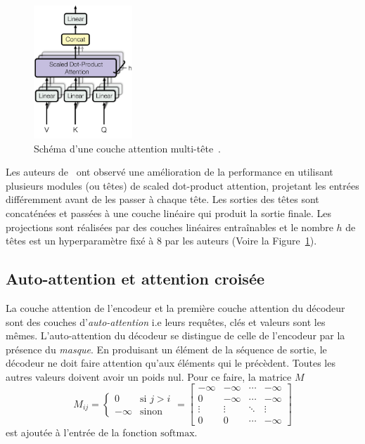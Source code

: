\begin{figure}[hbt]
    \centering
    \includegraphics[height=5cm]{assets/images/multihead-attention.png}
    \caption[Schéma d'une couche attention multitête.]
    {Schéma d'une couche attention multi-tête~\cite[Fig 2]{attention}.}
    \label{fig.multihead-attention}
\end{figure}

Les auteurs de~\cite{attention} ont observé une amélioration de la performance 
en utilisant plusieurs modules (ou têtes) de \foreignlanguage{english}{scaled dot-product attention},
projetant les entrées différemment avant de les passer à chaque tête.
Les sorties des têtes sont concaténées et passées à une couche linéaire qui produit la sortie finale.
Les projections sont réalisées par des couches linéaires entraînables et le nombre \(h\) de têtes est un hyperparamètre fixé à \(8\) par les auteurs%
(Voire la Figure~\ref{fig.multihead-attention}).

\subsection{Auto-attention et attention croisée}

La couche attention de l'encodeur et la première couche attention du décodeur sont des couches
d'\emph{auto-attention} i.e leurs requêtes, clés et valeurs sont les mêmes.
L'auto-attention du décodeur se distingue de celle de l'encodeur par la présence du \emph{masque}.
En produisant un élément de la séquence de sortie, le décodeur ne doit faire attention qu'aux éléments
qui le précèdent.
Toutes les autres valeurs doivent avoir un poids nul.
Pour ce faire, la matrice \(M\) 
\begin{equation}
    M_{ij} = \begin{cases}
        0 & \text{si } j > i \\
        -\infty & \text{sinon}
    \end{cases} 
    = \begin{bmatrix}
        -\infty & -\infty & \cdots & -\infty \\
        0       & -\infty & \cdots & -\infty \\
        \vdots  & \vdots  & \ddots & \vdots \\
        0       & 0       & \cdots & -\infty
    \end{bmatrix}
\end{equation}
est ajoutée à l'entrée de la fonction \(\text{softmax}\).

